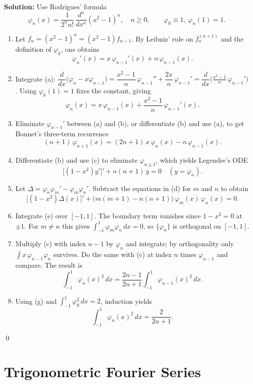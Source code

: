 \bigskip\noindent\textbf{Solution:}
Use Rodrigues' formula
\[
\varphi_n(x)=\frac{1}{2^{n} n!}\,\frac{d^n}{dx^n}(x^2-1)^n,\quad n\ge0,\qquad \varphi_0\equiv1,\ \varphi_n(1)=1.
\]
\begin{enumerate}[label=(\alph*)]
\item Let $f_n=(x^2-1)^n=(x^2-1)f_{n-1}$. By Leibniz' rule on $f_n^{(n+1)}$ and the definition of $\varphi_k$, one obtains
\[
\varphi_n'(x)=x\,\varphi_{n-1}'(x)+n\,\varphi_{n-1}(x).
\]
\item Integrate (a): $\dfrac{d}{dx}\big(\varphi_n - x\varphi_{n-1}\big) = \dfrac{x^2-1}{n}\,\varphi_{n-1}'' + \dfrac{2x}{n}\,\varphi_{n-1}' = \dfrac{d}{dx}\Big( \frac{x^2-1}{n}\,\varphi_{n-1}' \Big)$. Using $\varphi_k(1)=1$ fixes the constant, giving
\[
\varphi_n(x)=x\,\varphi_{n-1}(x)+\frac{x^2-1}{n}\,\varphi_{n-1}'(x).
\]
\item Eliminate $\varphi_{n-1}'$ between (a) and (b), or differentiate (b) and use (a), to get Bonnet's three-term recurrence
\[
(n+1)\,\varphi_{n+1}(x)=(2n+1)\,x\,\varphi_n(x)-n\,\varphi_{n-1}(x).
\]
\item Differentiate (b) and use (c) to eliminate $\varphi_{n\pm1}$, which yields Legendre's ODE
\[
\big[(1-x^2)y'\big]' + n(n+1)\,y=0\quad (y=\varphi_n).
\]
\item Let $\Delta=\varphi_n\varphi_m'-\varphi_m\varphi_n'$. Subtract the equations in (d) for $m$ and $n$ to obtain
\[
\big[(1-x^2)\Delta(x)\big]'+\big(m(m+1)-n(n+1)\big)\,\varphi_m(x)\,\varphi_n(x)=0.
\]
\item Integrate (e) over $[-1,1]$. The boundary term vanishes since $1-x^2=0$ at $\pm1$. For $m\ne n$ this gives $\int_{-1}^1\varphi_m\varphi_n\,dx=0$, so $\{\varphi_n\}$ is orthogonal on $[-1,1]$.
\item Multiply (c) with index $n-1$ by $\varphi_n$ and integrate; by orthogonality only $\int x\,\varphi_{n-1}\varphi_n$ survives. Do the same with (c) at index $n$ times $\varphi_{n-1}$ and compare. The result is
\[
\int_{-1}^1 \varphi_n(x)^2\,dx=\frac{2n-1}{2n+1}\int_{-1}^1 \varphi_{n-1}(x)^2\,dx.
\]
\item Using (g) and $\int_{-1}^1\varphi_0^2\,dx=2$, induction yields
\[
\int_{-1}^1 \varphi_n(x)^2\,dx=\frac{2}{2n+1}.
\]
\end{enumerate}\qed
\section{Trigonometric Fourier Series}



